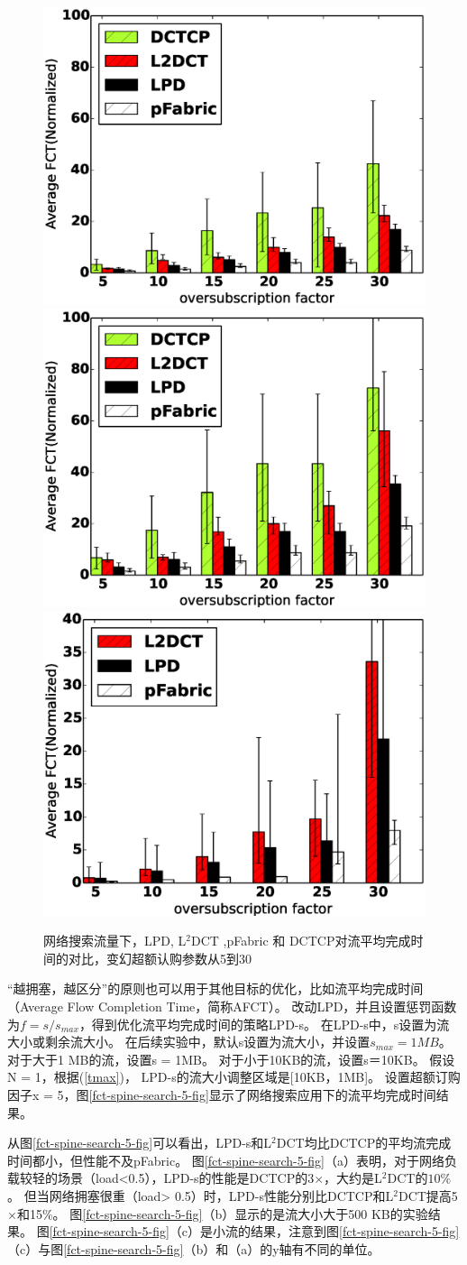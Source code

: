 \begin{figure}[h]
\centering
{}
 {\includegraphics[width=0.32\columnwidth]{figures/LPD/spineleaf/average_fct.eps}}
{\includegraphics[width=0.32\columnwidth]{figures/LPD/spineleaf/large_fct.eps}}
{\includegraphics[width=0.32\columnwidth]{figures/LPD/spineleaf/small_fct.eps}}
\caption{网络搜索流量下，LPD, L$^2$DCT ,pFabric 和 DCTCP对流平均完成时间的对比，变幻超额认购参数从5到30}
\label{fct-spine-fct-factor-fig}
\end{figure}


“越拥塞，越区分”的原则也可以用于其他目标的优化，比如流平均完成时间（Average Flow Completion Time，简称AFCT）。
改动LPD，并且设置惩罚函数为$f = s / s_{max}$，得到优化流平均完成时间的策略LPD-s。
在LPD-s中，s设置为流大小或剩余流大小。
在后续实验中，默认s设置为流大小，并设置$s_{max} = 1MB$。
对于大于1 MB的流，设置s = 1MB。
对于小于10KB的流，设置s＝10KB。
假设N = 1，根据(\ref{tmax})，
LPD-s的流大小调整区域是[10KB，1MB]。
设置超额订购因子x = 5，图\ref{fct-spine-search-5-fig}显示了网络搜索应用下的流平均完成时间结果。


从图\ref{fct-spine-search-5-fig}可以看出，LPD-s和L$^2$DCT均比DCTCP的平均流完成时间都小，但性能不及pFabric。
图\ref{fct-spine-search-5-fig}（a）表明，对于网络负载较轻的场景（load<0.5），LPD-s的性能是DCTCP的3$\times$，大约是L$^2$DCT的$10\%$。
但当网络拥塞很重（load> 0.5）时，LPD-s性能分别比DCTCP和L$^2$DCT提高5$\times$和15$\%$。
图\ref{fct-spine-search-5-fig}（b）显示的是流大小大于500 KB的实验结果。
图\ref{fct-spine-search-5-fig}（c）是小流的结果，注意到图\ref{fct-spine-search-5-fig}（c）与图\ref{fct-spine-search-5-fig}（b）和（a）的y轴有不同的单位。


